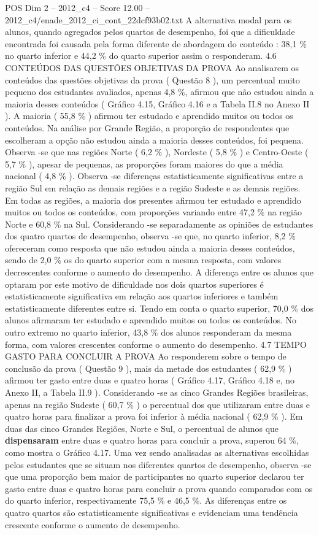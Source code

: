 \begin{textsample}{POS Dim 2 – 2012\_c4 – Score 12.00 – 2012\_c4/enade\_2012\_ci\_cont\_22dcf93b02.txt}
A alternativa modal para os alunos, quando agregados pelos quartos de desempenho, foi que a dificuldade encontrada foi causada pela forma diferente de abordagem do conteúdo : 38,1 \% no quarto inferior e 44,2 \% do quarto superior assim o responderam. 4.6 CONTEÚDOS DAS QUESTÕES OBJETIVAS DA PROVA Ao analisarem os conteúdos das questões objetivas da prova ( Questão 8 ), um percentual muito pequeno dos estudantes avaliados, apenas 4,8 \%, afirmou que não estudou ainda a maioria desses conteúdos ( Gráfico 4.15, Gráfico 4.16 e a Tabela II.8 no Anexo II ).
A maioria ( 55,8 \% ) afirmou ter estudado e aprendido muitos ou todos os conteúdos.
Na análise por Grande Região, a proporção de respondentes que escolheram a opção não estudou ainda a maioria desses conteúdos, foi pequena.
Observa -se que nas regiões Norte ( 6,2 \% ), Nordeste ( 5,8 \% ) e Centro-Oeste ( 5,7 \% ), apesar de pequenas, as proporções foram maiores do que a média nacional ( 4,8 \% ).
Observa -se diferenças estatisticamente significativas entre a região Sul em relação as demais regiões e a região Sudeste e as demais regiões.
Em todas as regiões, a maioria dos presentes afirmou ter estudado e aprendido muitos ou todos os conteúdos, com proporções variando entre 47,2 \% na região Norte e 60,8 \% na Sul.
Considerando -se separadamente as opiniões de estudantes dos quatro quartos de desempenho, observa -se que, no quarto inferior, 8,2 \% ofereceram como resposta que não estudou ainda a maioria desses conteúdos, sendo de 2,0 \% os do quarto superior com a mesma resposta, com valores decrescentes conforme o aumento do desempenho.
A diferença entre os alunos que optaram por este motivo de dificuldade nos dois quartos superiores é estatisticamente significativa em relação aos quartos inferiores e também estatisticamente diferentes entre si.
Tendo em conta o quarto superior, 70,0 \% dos alunos afirmaram ter estudado e aprendido muitos ou todos os conteúdos.
No outro extremo no quarto inferior, 43,8 \% dos alunos responderam da mesma forma, com valores crescentes conforme o aumento do desempenho. 4.7 TEMPO GASTO PARA CONCLUIR A PROVA Ao responderem sobre o tempo de conclusão da prova ( Questão 9 ), mais da metade dos estudantes ( 62,9 \% ) afirmou ter gasto entre duas e quatro horas ( Gráfico 4.17, Gráfico 4.18 e, no Anexo II, a Tabela II.9 ).
Considerando -se as cinco Grandes Regiões brasileiras, apenas na região Sudeste ( 60,7 \% ) o percentual dos que utilizaram entre duas e quatro horas para finalizar a prova foi inferior à média nacional ( 62,9 \% ).
Em duas das cinco Grandes Regiões, Norte e Sul, o percentual de alunos que \textbf{dispensaram} entre duas e quatro horas para concluir a prova, superou 64 \%, como mostra o Gráfico 4.17.
Uma vez sendo analisadas as alternativas escolhidas pelos estudantes que se situam nos diferentes quartos de desempenho, observa -se que uma proporção bem maior de participantes no quarto superior declarou ter gasto entre duas e quatro horas para concluir a prova quando comparados com os do quarto inferior, respectivamente 75,5 \% e 46,5 \%.
As diferenças entre os quatro quartos são estatisticamente significativas e evidenciam uma tendência crescente conforme o aumento de desempenho.


\end{textsample}
